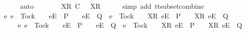 \begin{isabellebody}
\ \ \ \ \isamarkupfalse%
\ auto\isanewline
\ \ \isamarkupfalse%
\ \isamarkupfalse%
\ {\isachardoublequoteopen}{\isasymrho}{\isacharprime}\ {\isacharat}\ {\isacharbrackleft}{\isacharbrackleft}X{\isacharbrackright}\isactrlsub R{\isacharbrackright}\ {\isasymsubseteq}\isactrlsub C\ {\isasymrho}{\isacharprime}{\isacharprime}\ {\isacharat}\ {\isacharbrackleft}{\isacharbrackleft}X{\isacharprime}{\isacharbrackright}\isactrlsub R{\isacharbrackright}{\isachardoublequoteclose}\isanewline
\ \ \ \ \isamarkupfalse%
\ {\isacharparenleft}simp\ add{\isacharcolon}\ tt{\isacharunderscore}subset{\isacharunderscore}combine{\isacharparenright}\isanewline
\ \ \isamarkupfalse%
\ \isamarkupfalse%
\ {\isachardoublequoteopen}{\isacharbraceleft}e{\isachardot}\ e\ {\isasymnoteq}\ Tock\ {\isasymand}\ {\isasymrho}{\isacharprime}{\isacharprime}\ {\isacharat}\ {\isacharbrackleft}{\isacharbrackleft}e{\isacharbrackright}\isactrlsub E{\isacharbrackright}\ {\isasymin}\ P\ {\isasymand}\ {\isasymrho}{\isacharprime}{\isacharprime}\ {\isacharat}\ {\isacharbrackleft}{\isacharbrackleft}e{\isacharbrackright}\isactrlsub E{\isacharbrackright}\ {\isasymin}\ Q\ {\isasymor}\ e\ {\isacharequal}\ Tock\ {\isasymand}\ {\isasymrho}{\isacharprime}{\isacharprime}\ {\isacharat}\ {\isacharbrackleft}{\isacharbrackleft}X{\isacharprime}{\isacharbrackright}\isactrlsub R{\isacharcomma}\ {\isacharbrackleft}e{\isacharbrackright}\isactrlsub E{\isacharbrackright}\ {\isasymin}\ P\ {\isasymand}\ {\isasymrho}{\isacharprime}{\isacharprime}\ {\isacharat}\ {\isacharbrackleft}{\isacharbrackleft}X{\isacharprime}{\isacharbrackright}\isactrlsub R{\isacharcomma}\ {\isacharbrackleft}e{\isacharbrackright}\isactrlsub E{\isacharbrackright}\ {\isasymin}\ Q{\isacharbraceright}\isanewline
\ \ \ \ {\isasymsubseteq}\ {\isacharbraceleft}e{\isachardot}\ e\ {\isasymnoteq}\ Tock\ {\isasymand}\ {\isasymrho}{\isacharprime}\ {\isacharat}\ {\isacharbrackleft}{\isacharbrackleft}e{\isacharbrackright}\isactrlsub E{\isacharbrackright}\ {\isasymin}\ P\ {\isasymand}\ {\isasymrho}{\isacharprime}\ {\isacharat}\ {\isacharbrackleft}{\isacharbrackleft}e{\isacharbrackright}\isactrlsub E{\isacharbrackright}\ {\isasymin}\ Q\ {\isasymor}\ e\ {\isacharequal}\ Tock\ {\isasymand}\ {\isasymrho}{\isacharprime}\ {\isacharat}\ {\isacharbrackleft}{\isacharbrackleft}X{\isacharbrackright}\isactrlsub R{\isacharcomma}\ {\isacharbrackleft}e{\isacharbrackright}\isactrlsub E{\isacharbrackright}\ {\isasymin}\ P\ {\isasymand}\ {\isasymrho}{\isacharprime}\ {\isacharat}\ {\isacharbrackleft}{\isacharbrackleft}X{\isacharbrackright}\isactrlsub R{\isacharcomma}\ {\isacharbrackleft}e{\isacharbrackright}\isactrlsub E{\isacharbrackright}\ {\isasymin}\ Q{\isacharbraceright}{\isachardoublequoteclose}\isanewline

\end{isabellebody}
